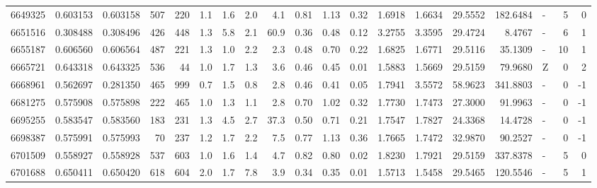 \begin{tabular}{rrrrrrrrrrrrrrrrlrr}
   6649325 & 0.603153 &   0.603158 &  507 &  220 &      1.1 &      1.6 &     2.0 &      4.1 &       0.81 &        1.13 &        0.32 &  1.6918 &  1.6634 &   29.5552 &  182.6484 &             - &        5 &          0 \\
   6651516 & 0.308488 &   0.308496 &  426 &  448 &      1.3 &      5.8 &     2.1 &     60.9 &       0.36 &        0.48 &        0.12 &  3.2755 &  3.3595 &   29.4724 &    8.4767 &             - &        6 &          1 \\
   6655187 & 0.606560 &   0.606564 &  487 &  221 &      1.3 &      1.0 &     2.2 &      2.3 &       0.48 &        0.70 &        0.22 &  1.6825 &  1.6771 &   29.5116 &   35.1309 &             - &       10 &          1 \\
   6665721 & 0.643318 &   0.643325 &  536 &   44 &      1.0 &      1.7 &     1.3 &      3.6 &       0.46 &        0.45 &        0.01 &  1.5883 &  1.5669 &   29.5159 &   79.9680 &             Z &        0 &          2 \\
   6668961 & 0.562697 &   0.281350 &  465 &  999 &      0.7 &      1.5 &     0.8 &      2.8 &       0.46 &        0.41 &        0.05 &  1.7941 &  3.5572 &   58.9623 &  341.8803 &             - &        0 &         -1 \\
   6681275 & 0.575908 &   0.575898 &  222 &  465 &      1.0 &      1.3 &     1.1 &      2.8 &       0.70 &        1.02 &        0.32 &  1.7730 &  1.7473 &   27.3000 &   91.9963 &             - &        0 &         -1 \\
   6695255 & 0.583547 &   0.583560 &  183 &  231 &      1.3 &      4.5 &     2.7 &     37.3 &       0.50 &        0.71 &        0.21 &  1.7547 &  1.7827 &   24.3368 &   14.4728 &             - &        0 &         -1 \\
   6698387 & 0.575991 &   0.575993 &   70 &  237 &      1.2 &      1.7 &     2.2 &      7.5 &       0.77 &        1.13 &        0.36 &  1.7665 &  1.7472 &   32.9870 &   90.2527 &             - &        0 &         -1 \\
   6701509 & 0.558927 &   0.558928 &  537 &  603 &      1.0 &      1.6 &     1.4 &      4.7 &       0.82 &        0.80 &        0.02 &  1.8230 &  1.7921 &   29.5159 &  337.8378 &             - &        5 &          0 \\
   6701688 & 0.650411 &   0.650420 &  618 &  604 &      2.0 &      1.7 &     7.8 &      3.9 &       0.34 &        0.35 &        0.01 &  1.5713 &  1.5458 &   29.5465 &  120.5546 &             - &        5 &          1 \\

\end{tabular}
